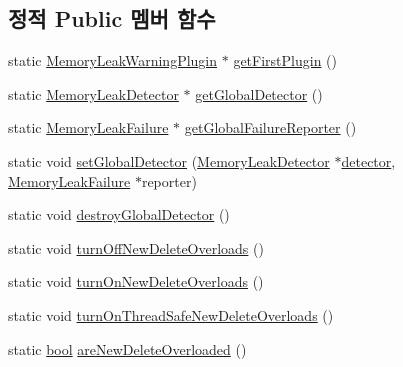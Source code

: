 \subsection*{정적 Public 멤버 함수}
\begin{DoxyCompactItemize}
\item 
static \hyperlink{class_memory_leak_warning_plugin}{Memory\+Leak\+Warning\+Plugin} $\ast$ \hyperlink{class_memory_leak_warning_plugin_a6560385960fe023f4bf7a186c86a2dc8}{get\+First\+Plugin} ()
\item 
static \hyperlink{class_memory_leak_detector}{Memory\+Leak\+Detector} $\ast$ \hyperlink{class_memory_leak_warning_plugin_abdb34ff63a853e006d310e0600d444f3}{get\+Global\+Detector} ()
\item 
static \hyperlink{class_memory_leak_failure}{Memory\+Leak\+Failure} $\ast$ \hyperlink{class_memory_leak_warning_plugin_a343bb978a305e5afce39cb2154b473e0}{get\+Global\+Failure\+Reporter} ()
\item 
static void \hyperlink{class_memory_leak_warning_plugin_a72a921eb32d7825a785c1c9a25fb3106}{set\+Global\+Detector} (\hyperlink{class_memory_leak_detector}{Memory\+Leak\+Detector} $\ast$\hyperlink{_memory_leak_warning_test_8cpp_ac8739104aacc5b78a443b3441f5e43d8}{detector}, \hyperlink{class_memory_leak_failure}{Memory\+Leak\+Failure} $\ast$reporter)
\item 
static void \hyperlink{class_memory_leak_warning_plugin_a69dc7f8c2f505d62b3916437fb59c7af}{destroy\+Global\+Detector} ()
\item 
static void \hyperlink{class_memory_leak_warning_plugin_a570ab0e6ae0556a885c5459e02318a18}{turn\+Off\+New\+Delete\+Overloads} ()
\item 
static void \hyperlink{class_memory_leak_warning_plugin_aaad06540a387a4e40670a6c6f988e94c}{turn\+On\+New\+Delete\+Overloads} ()
\item 
static void \hyperlink{class_memory_leak_warning_plugin_a0559f29cb452d6bb4a58c9730e2c6cf2}{turn\+On\+Thread\+Safe\+New\+Delete\+Overloads} ()
\item 
static \hyperlink{avb__gptp_8h_af6a258d8f3ee5206d682d799316314b1}{bool} \hyperlink{class_memory_leak_warning_plugin_ac299937de1c7fe0649c5778c6063ed5a}{are\+New\+Delete\+Overloaded} ()
\end{DoxyCompactItemize}
